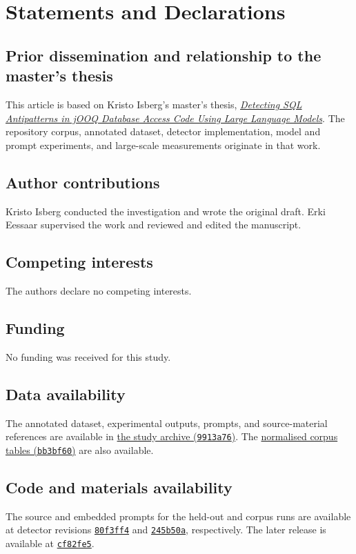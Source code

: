 \documentclass[smallextended,natbib]{../template/svjour3}
\begin{document}


\section*{Statements and Declarations}

\subsection*{Prior dissemination and relationship to the master's thesis}
This article is based on Kristo Isberg's master's thesis, \href{https://digikogu.taltech.ee/en/Item/37cea9cf-3d0f-4aef-935c-ecdab7db0dcd}{\emph{Detecting SQL Antipatterns in jOOQ Database Access Code Using Large Language Models}}. The repository corpus, annotated dataset, detector implementation, model and prompt experiments, and large-scale measurements originate in that work.

\subsection*{Author contributions}
Kristo Isberg conducted the investigation and wrote the original draft. Erki Eessaar supervised the work and reviewed and edited the manuscript.

\subsection*{Competing interests}
The authors declare no competing interests.

\subsection*{Funding}
No funding was received for this study.

\subsection*{Data availability}
The annotated dataset, experimental outputs, prompts, and source-material references are available in \href{https://github.com/kristoisberg/masters-thesis/tree/9913a7670fce52b135651f95ff18cd505c61b142}{the study archive (\texttt{9913a76})}. The \href{https://github.com/kristoisberg/thesis-paper/tree/bb3bf6056cc7bbda29bb0fb5f0b720e7f9d06028/analysis}{normalised corpus tables (\texttt{bb3bf60})} are also available.

\subsection*{Code and materials availability}
The source and embedded prompts for the held-out and corpus runs are available at detector revisions \href{https://github.com/kristoisberg/jooq-antipattern-detector/tree/80f3ff4eeabdc3fec860bc35bb9a4566fe130763}{\texttt{80f3ff4}} and \href{https://github.com/kristoisberg/jooq-antipattern-detector/tree/245b50aa381d9917e5febf9f4ab0cd13d1b9d944}{\texttt{245b50a}}, respectively. The later release is available at \href{https://github.com/kristoisberg/jooq-antipattern-detector/tree/cf82fe56acb728f076df67279ff4a78a138996f3}{\texttt{cf82fe5}}.
\end{document}

